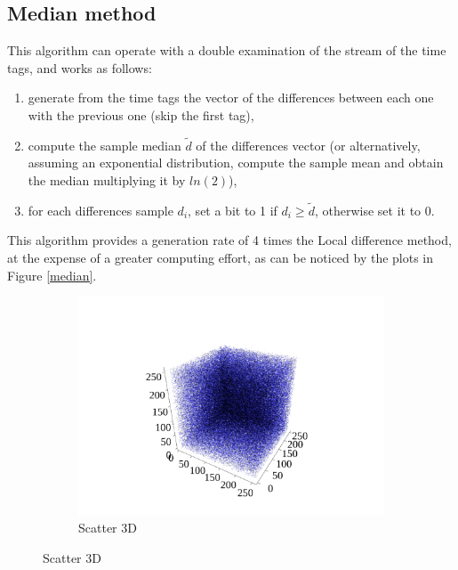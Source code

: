 \documentclass[10pt, final]{article}
\begin{document}
\begin{multicols}{2}
\subsection*{Median method}
This algorithm can operate with a double examination of the stream of the time tags, and works as follows:
\begin{enumerate}
    \item generate from the time tags the vector of the differences between each one with the previous one (skip the first tag),
    \item compute the sample median $\widetilde{d}$ of the differences vector (or alternatively, assuming an exponential distribution, compute the sample mean and obtain the median multiplying it by $ln(2)$),
    \item for each differences sample $d_i$, set a bit to 1 if $d_i \geq \widetilde{d}$, otherwise set it to 0.
\end{enumerate}
This algorithm provides a generation rate of 4 times the Local difference method, at the expense of a greater computing effort, as can be noticed by the plots in Figure \ref{median}.
\begin{mdframed}
    \begin{figure}[H]
        \begin{subfigure}{\textwidth}
            \centering
            \includegraphics[width = \textwidth]{../random_img/naif-scatter3d.pdf}
            \caption{Scatter 3D}
        \end{subfigure}


\end{figure}
\end{mdframed}
\end{multicols}
\end{document}
